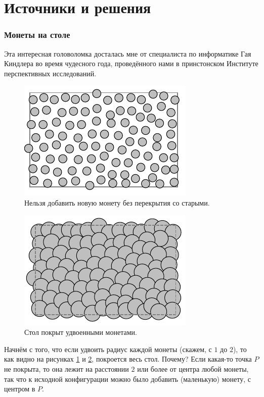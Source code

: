 \section*{Источники и решения}

\subsubsection*{Монеты на столе}

Эта интересная головоломка досталась мне от специалиста по информатике Гая Киндлера во время чудесного года, проведённого нами в принстонском Институте перспективных исследований.

\begin{figure}[t!]
\centering
\includegraphics[scale=1]{pics/coin1}
\caption{Нельзя добавить новую монету без перекрытия со старыми.}
\label{pic:coin1}
\end{figure}

\begin{figure}[b!]
\centering
\includegraphics[scale=1]{pics/coin2}
\caption{Стол покрыт удвоенными монетами.}
\label{pic:coin2}
\end{figure}

Начнём с того, что если удвоить радиус каждой монеты (скажем, с $1$ до $2$), то как видно на рисунках \ref{pic:coin1} и \ref{pic:coin2}, покроется весь стол.
Почему?
Если какая-то точка $P$ не покрыта, то она лежит на расстоянии $2$ или более от центра любой монеты, так что к исходной конфигурации можно было добавить (маленькую) монету, с центром в $P$.

